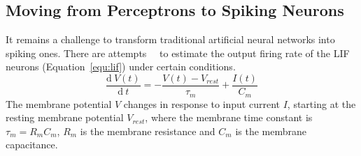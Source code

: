 \documentclass[journal]{journal}
\def\D{\mathrm{d}}
\begin{document}
\subsection{Moving from Perceptrons to Spiking Neurons}
It remains a challenge to transform traditional artificial neural networks into spiking ones.
There are attempts~\cite{la2008response}~\cite{burkitt2006review} to estimate the output firing rate of the LIF neurons (Equation~\ref{equ:lif}) under certain conditions. 
\begin{equation}
\frac{\D \: V(t)}{\D\:  t}=-\frac{V(t)-V_\mathit{rest}}{\tau_m}+\frac{I(t)}{C_m}
\label{equ:lif}
\end{equation}
The membrane potential $V$ changes in response to input current $I$, starting at the resting membrane potential  $V_{rest}$, where the membrane time constant is $\tau_m = R_mC_m$, $R_m$ is the membrane resistance and $C_m$ is the membrane capacitance.
\end{document}
